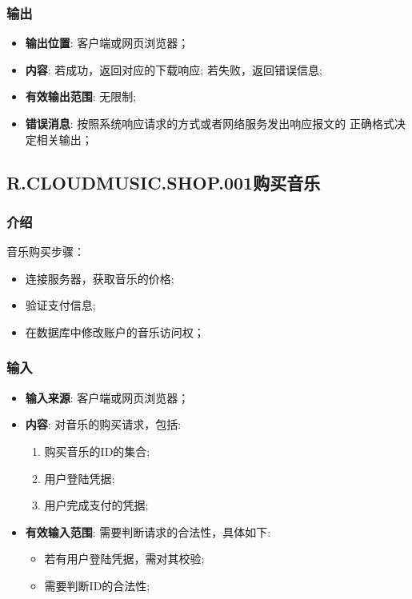 \subsubsection{输出}
\begin{itemize}
	\item \textbf{输出位置}: 客户端或网页浏览器；
	\item \textbf{内容}: 若成功，返回对应的下载响应; 若失败，返回错误信息;
	\item \textbf{有效输出范围}: 无限制;
	\item \textbf{错误消息}: 按照系统响应请求的方式或者网络服务发出响应报文的
		正确格式决定相关输出；
\end{itemize}

\subsection{R.CLOUDMUSIC.SHOP.001购买音乐}
\subsubsection{介绍}
	音乐购买步骤：
	\begin{itemize}
		\item 连接服务器，获取音乐的价格;
		\item 验证支付信息;
		\item 在数据库中修改账户的音乐访问权；
	\end{itemize}
\subsubsection{输入}
	\begin{itemize}
		\item \textbf{输入来源}: 客户端或网页浏览器；
		\item \textbf{内容}: 对音乐的购买请求，包括: 
		\begin{enumerate}
			\item 购买音乐的ID的集合;
			\item 用户登陆凭据;
			\item 用户完成支付的凭据;
		\end{enumerate}
		\item \textbf{有效输入范围}: 需要判断请求的合法性，具体如下: 
		\begin{itemize}
			\item 若有用户登陆凭据，需对其校验;
			\item 需要判断ID的合法性;
		\end{itemize}
	\end{itemize}
